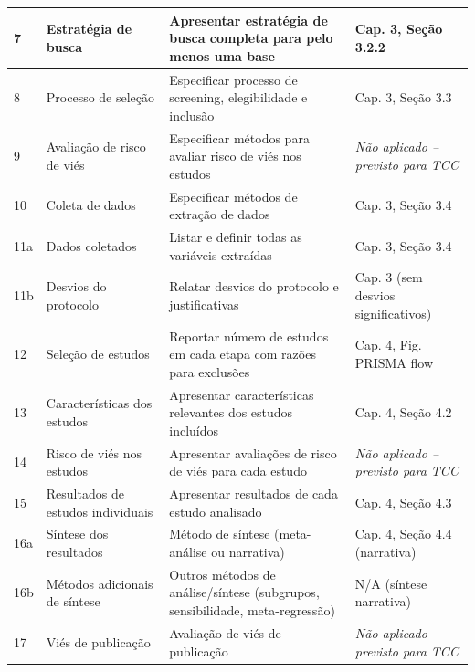 \begin{apendicesenv}
\begin{longtable}{|p{0.5cm}|p{3.5cm}|p{6cm}|p{3cm}|}
7 & Estratégia de busca & Apresentar estratégia de busca completa para pelo menos uma base & Cap. 3, Seção 3.2.2 \\
\hline

8 & Processo de seleção & Especificar processo de screening, elegibilidade e inclusão & Cap. 3, Seção 3.3 \\
\hline

9 & Avaliação de risco de viés & Especificar métodos para avaliar risco de viés nos estudos & \textit{Não aplicado -- previsto para TCC} \\
\hline

10 & Coleta de dados & Especificar métodos de extração de dados & Cap. 3, Seção 3.4 \\
\hline

11a & Dados coletados & Listar e definir todas as variáveis extraídas & Cap. 3, Seção 3.4 \\
\hline

11b & Desvios do protocolo & Relatar desvios do protocolo e justificativas & Cap. 3 (sem desvios significativos) \\
\hline

12 & Seleção de estudos & Reportar número de estudos em cada etapa com razões para exclusões & Cap. 4, Fig. PRISMA flow \\
\hline

13 & Características dos estudos & Apresentar características relevantes dos estudos incluídos & Cap. 4, Seção 4.2 \\
\hline

14 & Risco de viés nos estudos & Apresentar avaliações de risco de viés para cada estudo & \textit{Não aplicado -- previsto para TCC} \\
\hline

15 & Resultados de estudos individuais & Apresentar resultados de cada estudo analisado & Cap. 4, Seção 4.3 \\
\hline

16a & Síntese dos resultados & Método de síntese (meta-análise ou narrativa) & Cap. 4, Seção 4.4 (narrativa) \\
\hline

16b & Métodos adicionais de síntese & Outros métodos de análise/síntese (subgrupos, sensibilidade, meta-regressão) & N/A (síntese narrativa) \\
\hline

17 & Viés de publicação & Avaliação de viés de publicação & \textit{Não aplicado -- previsto para TCC} \\
\hline


\end{longtable}
\end{apendicesenv}
